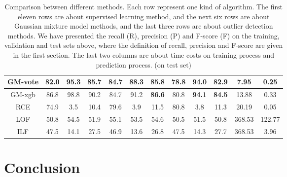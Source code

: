 \documentclass[english]{article}
\begin{document}
\begin{table}[h]
\begin{tabular}{|c|c|c|c|c|c|c|c|c|c|c|c|}
\hline
GM-vote & 82.0 & 95.3 & 85.7 & 84.7 & 88.3 & 85.8 & 78.8 & 94.0 & 82.9 & 7.95 & 0.25 \\
\hline
GM-xgb & 86.8 & 98.8 & 90.2 & 84.7 & 91.2 & \textbf{86.6} & 80.8 & \textbf{94.1} & \textbf{84.5} & 13.88 & 0.33 \\
\hline
RCE & 74.9 & 3.5 & 10.4 & 79.6 & 3.9 & 11.5 & 80.8 & 3.8 & 11.3 & 20.19 & 0.05 \\
\hline
LOF & 50.8 & 54.5 & 51.9 & 55.1 & 53.5 & 54.6 & 50.5 & 51.5 & 50.8 & 368.53 & 122.77 \\
\hline
ILF & 47.5 & 14.1 & 27.5 & 46.9 & 13.6 & 26.8 & 47.5 & 14.3 & 27.7 & 368.53 & 3.96 \\
\hline
	\end{tabular}
	\caption{Comparison between different methods. Each row represent one kind of algorithm. The first eleven rows are about supervised learning method, and the next six rows are about Gaussian mixture model methods, and the last three rows are about outlier detection methods. We have presented the recall (R), precision (P) and F-score (F) on the training, validation and test sets above, where the definition of recall, precision and F-score are given in the first section. The last two columns are about time costs on training process and prediction process. (on test set)}
	\label{comparison}
\end{table}

\section{Conclusion}




\end{document}
